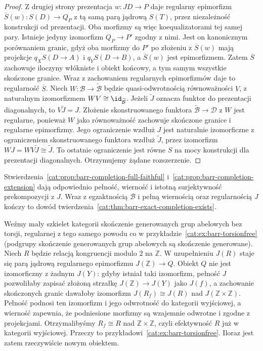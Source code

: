 \begin{proof}
Z drugiej strony prezentacja $w:JD\to P$ daje regularny epimorfizm $\overline S(w):S(D)\to Q_P$ z tą samą parą jądrową $S(T)$, przez niezależność konstrukcji od prezentacji. Oba morfizmy są więc koequalizatorami tej samej pary. Istnieje jedyny izomorfizm $Q_P\to P'$ zgodny z nimi. Jest on kanonicznym porównaniem granic, gdyż oba morfizmy do $P'$ po złożeniu z $\overline S(w)$ mają projekcje $q_X S(D\to A)$ i $q_Y S(D\to B)$, a $\overline S(w)$ jest epimorfizmem. Zatem $\overline S$ zachowuje iloczyny włókniste i obiekt końcowy, a tym samym wszystkie skończone granice. Wraz z zachowaniem regularnych epimorfizmów daje to regularność $\overline S$. Niech $W:\mathcal B\to\widetilde{\mathcal B}$ będzie quasi-odwrotnością równoważności $V$, z naturalnym izomorfizmem $WV\cong\id_{\widetilde{\mathcal B}}$. Jeżeli $\widetilde J$ oznacza funktor do prezentacji diagonalnych, to $V\widetilde J=J$. Złożenie skonstruowanego funktora $\widetilde{\mathcal B}\to\mathcal D$ z $W$ jest regularne, ponieważ $W$ jako równoważność zachowuje skończone granice i regularne epimorfizmy. Jego ograniczenie wzdłuż $J$ jest naturalnie izomorficzne z ograniczeniem skonstruowanego funktora wzdłuż $\widetilde J$, przez izomorfizm $WJ=WV\widetilde J\cong\widetilde J$. To ostatnie ograniczenie jest równe $S$ na mocy konstrukcji dla prezentacji diagonalnych. Otrzymujemy żądane rozszerzenie.
\end{proof}

Stwierdzenia~\ref{cat:prop:barr-completion-full-faithful} i~\ref{cat:prop:barr-completion-extension} dają odpowiednio pełność, wierność i istotną surjektywność prekompozycji z $J$. Wraz z egzaktnością $\mathcal B$ i pełną wiernością oraz regularnością $J$ kończy to dowód twierdzenia~\ref{cat:thm:barr-exact-completion-exists}.

\begin{przyklad}\label{cat:ex:barr-completion-new-quotient}
Weźmy mały szkielet kategorii skończenie generowanych grup abelowych bez torsji, regularnej z tego samego powodu co w przykładzie~\ref{cat:ex:barr-torsionfree} (podgrupy skończenie generowanych grup abelowych są skończenie generowane). Niech $R$ będzie relacją kongruencji modulo $2$ na $\mathbb Z$. W uzupełnieniu $J(R)$ staje się parą jądrową regularnego epimorfizmu $J(\mathbb Z)\to Q$. Obiekt $Q$ nie jest izomorficzny z żadnym $J(Y)$: gdyby istniał taki izomorfizm, pełność $J$ pozwoliłaby zapisać złożoną strzałkę $J(\mathbb Z)\to J(Y)$ jako $J(f)$, a zachowanie skończonych granic dawałoby izomorfizm $J(R_f)\cong J(R)$ nad $J(\mathbb Z\times\mathbb Z)$. Pełność podnosi ten izomorfizm i jego odwrotność do kategorii wyjściowej, a wierność zapewnia, że podniesione morfizmy są wzajemnie odwrotne i zgodne z projekcjami. Otrzymalibyśmy $R_f\cong R$ nad $\mathbb Z\times\mathbb Z$, czyli efektywność $R$ już w kategorii wyjściowej. Przeczy to przykładowi~\ref{cat:ex:barr-torsionfree}. Iloraz jest zatem rzeczywiście nowym obiektem.
\end{przyklad}

